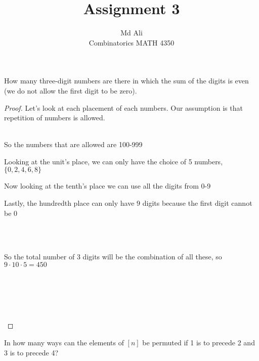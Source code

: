 \documentclass[12pt]{article}
\newenvironment{problem}[2][Problem]{\begin{trivlist}
\item[\hskip \labelsep {\bfseries #1}\hskip \labelsep {\bfseries #2.}]}{\end{trivlist}}
\begin{document}
 
 
\title{Assignment 3}%
\author{Md Ali\\ %
Combinatorics MATH 4350} %
 
\maketitle
 
\begin{problem}{1} %
How many three-digit numbers are there in which the sum of the digits is even (we do not allow the first digit to be zero).
\end{problem}
 
\begin{proof}
Let's look at each placement of each numbers. Our assumption is that repetition of numbers is allowed.\\ \\
\centerline{So the numbers that are allowed are 100-999}
\centerline{Looking at the unit's place, we can only have the choice of 5 numbers, $\{ 0,2,4,6,8\}$}
\centerline{Now looking at the tenth's place we can use all the digits from 0-9}
\centerline{Lastly, the hundredth place can only have 9 digits because the first digit cannot be 0} \\ \\
\centerline{So the total number of 3 digits will be the combination of all these, so $9 \cdot 10 \cdot 5 = 450$} \\ \\
\centerline{} \\ \\
\end{proof}

\begin{problem}{2}
In how many ways can the elements of $[n]$ be permuted if 1 is to precede 2 and 3 is to precede 4?
\end{problem}
\end{document}
